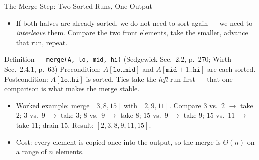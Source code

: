 \documentclass[aspectratio=169]{beamer}
\begin{document}
\begin{frame}{The Merge Step: Two Sorted Runs, One Output}
  \begin{itemize}
    \item If both halves are already sorted, we do not need to sort again ---
      we need to \emph{interleave} them. Compare the two front elements, take
      the smaller, advance that run, repeat.
  \end{itemize}
  \begin{block}{Definition --- \texttt{merge(A, lo, mid, hi)}
    (Sedgewick Sec.~2.2, p.~270; Wirth Sec.~2.4.1, p.~63)}
    Precondition: $A[\texttt{lo}..\texttt{mid}]$ and
    $A[\texttt{mid}+1..\texttt{hi}]$ are each sorted. Postcondition:
    $A[\texttt{lo}..\texttt{hi}]$ is sorted. Ties take the \emph{left} run
    first --- that one comparison is what makes the merge stable.
  \end{block}
  \begin{itemize}
    \item Worked example: merge $[3,8,15]$ with $[2,9,11]$.
      Compare $3$ vs.\ $2$ $\to$ take $2$; $3$ vs.\ $9$ $\to$ take $3$;
      $8$ vs.\ $9$ $\to$ take $8$; $15$ vs.\ $9$ $\to$ take $9$;
      $15$ vs.\ $11$ $\to$ take $11$; drain $15$.
      Result: $[2,3,8,9,11,15]$.
    \item Cost: every element is copied once into the output, so the merge
      is $\Theta(n)$ on a range of $n$ elements.
  \end{itemize}
\end{frame}
\end{document}
